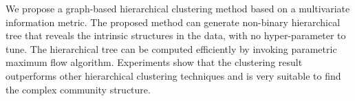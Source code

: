 We propose a graph-based hierarchical clustering method based on a multivariate information metric.
The proposed method can generate non-binary hierarchical tree that reveals the intrinsic structures in the data, with no hyper-parameter to tune. 
The hierarchical tree can be computed efficiently by 
invoking parametric maximum flow algorithm. 
Experiments show that the clustering result outperforms
other hierarchical clustering techniques and is very suitable to find the complex community structure.